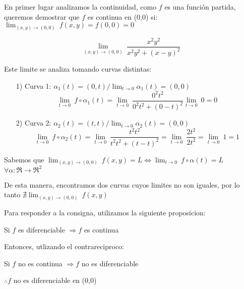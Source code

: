 \begin{solution}
   En primer lugar analizamos la continuidad, como $f$ es una función partida, queremos demostrar que $f$ es continua en (0,0) si:  $\lim_{(x,y)\to(0,0)} \ f(x,y) = f(0,0)=0$
   
    \[
        \lim_{(x,y)\to(0,0)} \
         \frac{x^2y^2}{x^2y^2+(x-y)^2}
    \]

    Este limite se analiza tomando curvas distintas:

\begin{itemize}
    \item[1)] Curva 1: $\alpha_1(t)=(0,t) / \lim_{t\to0} \alpha_1(t) = (0,0)$
    \[
         \lim_{t\to0} \
          f\circ\alpha_1(t)=\lim_{t\to0} \
         \frac{0^2t^2}{0^2t^2+(0-t)^2}\lim_{t\to0} \
          0=0
    \]

     \item[2)]  Curva 2: $\alpha_2(t)=(t,t) / \lim_{t\to0} \alpha_2(t) = (0,0)$
     \[
         \lim_{t\to0} \
          f\circ\alpha_2(t)=\lim_{t\to0} \
         \frac{t^2t^2}{t^2t^2+(t-t)^2}=\lim_{t\to0} \
         \frac{2t^2}{2t^2}=\lim_{t\to0} \
         1=1
    \]
\end{itemize}
Sabemos que $\lim_{(x,y)\to(0,0)} \ f(x,y) = L \iff \lim_{t\to0} \ f\circ\alpha(t)=L  $          $ \forall\alpha:\Re\rightarrow\Re^2  $ 

   
De esta manera, encontramos dos curvas cuyos limites no son iguales, por lo tanto $\nexists \lim_{(x,y)\to(0,0)} \ f(x,y)$

Para responder a la consigna, utilizamos la siguiente proposicion:
 \begin{center} Si $f$ es diferenciable $\Rightarrow f$ es continua \end{center}

 Entonces, utlizando el contrareciproco: 
\begin{center}Si $f$ no es continua $\Rightarrow f$ no es diferenciable \end{center}

$\therefore f $ no es diferenciable en (0,0)
 
\end{solution}



